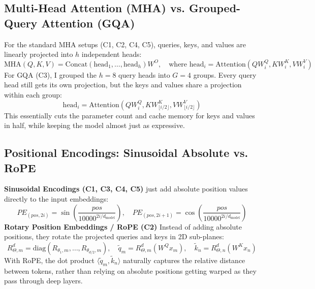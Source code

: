 \documentclass[12pt,a4paper]{article}
\begin{document}
\subsection{Multi-Head Attention (MHA) vs. Grouped-Query Attention (GQA)}
For the standard MHA setups (C1, C2, C4, C5), queries, keys, and values are linearly projected into $h$ independent heads:
\begin{equation}
\text{MHA}(Q, K, V) = \text{Concat}(\text{head}_1, \dots, \text{head}_h) W^O, \quad \text{where } \text{head}_i = \text{Attention}(Q W_i^Q, K W_i^K, V W_i^V)
\end{equation}
For GQA (C3), I grouped the $h=8$ query heads into $G=4$ groups. Every query head still gets its own projection, but the keys and values share a projection within each group:
\begin{equation}
\text{head}_i = \text{Attention}(Q W_i^Q, K W_{\lfloor i / 2 \rfloor}^K, V W_{\lfloor i / 2 \rfloor}^V)
\end{equation}
This essentially cuts the parameter count and cache memory for keys and values in half, while keeping the model almost just as expressive.

\subsection{Positional Encodings: Sinusoidal Absolute vs. RoPE}
\textbf{Sinusoidal Encodings (C1, C3, C4, C5)} just add absolute position values directly to the input embeddings:
\begin{equation}
PE_{(pos, 2i)} = \sin\left(\frac{pos}{10000^{2i/d_{\text{model}}}}\right), \quad PE_{(pos, 2i+1)} = \cos\left(\frac{pos}{10000^{2i/d_{\text{model}}}}\right)
\end{equation}
\textbf{Rotary Position Embeddings / RoPE (C2)} Instead of adding absolute positions, they rotate the projected queries and keys in 2D sub-planes:
\begin{equation}
R_{\Theta, m}^d = \text{diag}\left(R_{\theta_1, m}, \dots, R_{\theta_{d/2}, m}\right), \quad \tilde{q}_m = R_{\Theta, m}^d (W^Q x_m), \quad \tilde{k}_n = R_{\Theta, n}^d (W^K x_n)
\end{equation}
With RoPE, the dot product $\langle \tilde{q}_m, \tilde{k}_n \rangle$ naturally captures the relative distance between tokens, rather than relying on absolute positions getting warped as they pass through deep layers.
\end{document}
